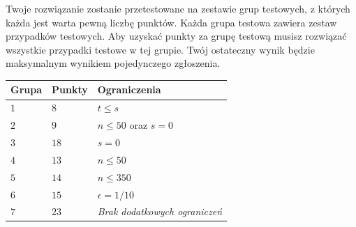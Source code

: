 Twoje rozwiązanie zostanie przetestowane na zestawie grup testowych, z których każda jest warta pewną liczbę punktów.
Każda grupa testowa zawiera zestaw przypadków testowych.
Aby uzyskać punkty za grupę testową musisz rozwiązać wszystkie przypadki testowe w tej grupie.
Twój ostateczny wynik będzie maksymalnym wynikiem pojedynczego zgłoszenia.

\medskip
\noindent
\begin{tabular}{lll}
 Grupa & Punkty & Ograniczenia\\\hline
  $1$ & $8$ &  $t\leq s$\\
  $2$ & $9$ & $n\le 50$ oraz $s=0$\\
  $3$ & $18$ & $s=0$\\
  $4$ & $13$ & $n\leq 50$\\
  $5$ & $14$ & $n\leq 350$\\
  $6$ & $15$ & $\epsilon = 1/10$\\
  $7$ & $23$ & \emph{Brak dodatkowych ograniczeń}\\
\end{tabular}
